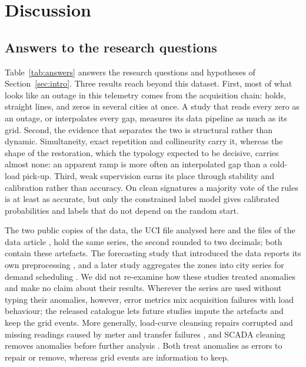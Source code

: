 \section{Discussion}\label{sec:discussion}

\subsection{Answers to the research questions}\label{sec:answers}

Table~\ref{tab:answers} answers the research questions and hypotheses of Section~\ref{sec:intro}. Three results reach beyond this dataset. First, most of what looks like an outage in this telemetry comes from the acquisition chain: holds, straight lines, and zeros in several cities at once. A study that reads every zero as an outage, or interpolates every gap, measures its data pipeline as much as its grid. Second, the evidence that separates the two is structural rather than dynamic. Simultaneity, exact repetition and collinearity carry it, whereas the shape of the restoration, which the typology expected to be decisive, carries almost none: an apparent ramp is more often an interpolated gap than a cold-load pick-up. Third, weak supervision earns its place through stability and calibration rather than accuracy. On clean signatures a majority vote of the rules is at least as accurate, but only the constrained label model gives calibrated probabilities and labels that do not depend on the random start.

The two public copies of the data, the UCI file analysed here \cite{bensalah2025uci} and the files of the data article \cite{bensalah2025dib}, hold the same series, the second rounded to two decimals; both contain these artefacts. The forecasting study that introduced the data reports its own preprocessing \cite{bensalah2025opsearch}, and a later study aggregates the zones into city series for demand scheduling \cite{sarange2026}. We did not re-examine how these studies treated anomalies and make no claim about their results. Wherever the series are used without typing their anomalies, however, error metrics mix acquisition failures with load behaviour; the released catalogue lets future studies impute the artefacts and keep the grid events. More generally, load-curve cleansing repairs corrupted and missing readings caused by meter and transfer failures \cite{chen2010cleansing}, and SCADA cleaning removes anomalies before further analysis \cite{morrison2022scada}. Both treat anomalies as errors to repair or remove, whereas grid events are information to keep.

